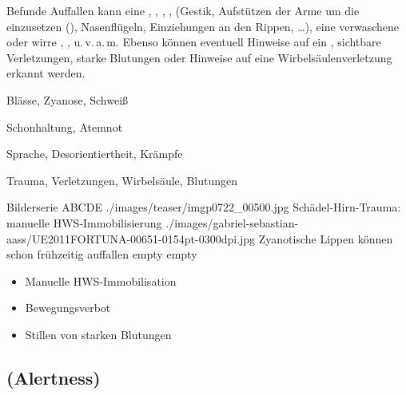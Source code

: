 \Text
{{\eye} Befunde}
{Auffallen kann eine , ,
, ,
 (Gestik, Aufstützen der Arme um die 
einzusetzen (),
Nasenflügeln, Einziehungen an den Rippen, \ldots{}), eine
verwaschene oder wirre , ,
 u.\,v.\,a.\,m. Ebenso
können eventuell Hinweise auf ein , sichtbare
Verletzungen, starke Blutungen oder Hinweise auf eine
Wirbelsäulenverletzung erkannt werden.}
{\begin{compactitem}
    \item Blässe, Zyanose, Schweiß
    \item Schonhaltung, Atemnot
    \item Sprache, Desorientiertheit,
    Krämpfe
  \item Trauma, Verletzungen, Wirbelsäule, Blutungen
  \end{compactitem}}
{}
{}
{}

\begin{PictureSeriesWide}{}{Bilderserie ABCDE}
{./images/teaser/imgp0722_00500.jpg}
{Schädel-Hirn-Trauma: manuelle HWS-Immobilisierung  }
{./images/gabriel-sebastian-aass/UE2011FORTUNA-00651-0154pt-0300dpi.jpg}
{Zyanotische Lippen können schon frühzeitig auffallen }
{empty}
{}
{empty}
{}
\end{PictureSeriesWide}

{%
\begin{itemize}
  \item Manuelle HWS-Immobilisation
  \item Bewegungsverbot
  \item Stillen von starken Blutungen
\end{itemize}
}

\clearpage
\subsection{{} 
(Alertness)}



\label{topic:bewusstsein-advanced}



